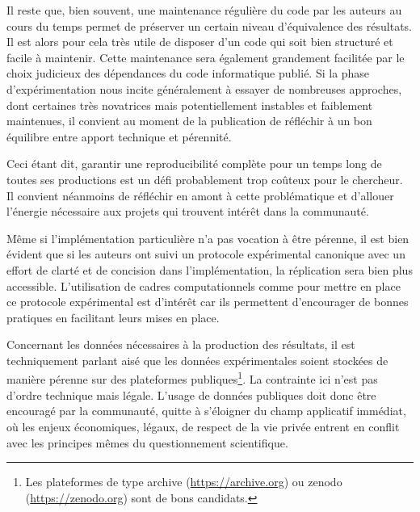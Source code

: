 Il reste que, bien souvent, une maintenance régulière du code par les auteurs au cours du temps permet de préserver un certain niveau d'équivalence des résultats. Il est alors pour cela très utile de disposer d'un code qui soit bien structuré et facile à maintenir. Cette maintenance sera également grandement facilitée par le choix judicieux des dépendances du code informatique publié. Si la phase d'expérimentation nous incite généralement à essayer de nombreuses approches, dont certaines très novatrices mais potentiellement instables et faiblement maintenues, il convient au moment de la publication de réfléchir à un bon équilibre entre apport technique et pérennité.

Ceci étant dit, garantir une reproducibilité complète pour un temps long de toutes ses productions est un défi probablement trop coûteux pour le chercheur. Il convient néanmoins de réfléchir en amont à cette problématique et d'allouer l'énergie nécessaire aux projets qui trouvent intérêt dans la communauté.

Même si l'implémentation particulière n'a pas vocation à être pérenne, il est bien évident que si les auteurs ont suivi un protocole expérimental canonique avec un effort de clarté et de concision dans l'implémentation, la réplication sera bien plus accessible. L'utilisation de cadres computationnels comme \explanes pour mettre en place ce protocole expérimental est d'intérêt car ils permettent d'encourager de bonnes pratiques en facilitant leurs mises en place.

Concernant les données nécessaires à la production des résultats, il est techniquement parlant aisé que les données expérimentales soient stockées de manière pérenne sur des plateformes publiques\footnote{Les plateformes de type \textsf
{archive} (\url{https://archive.org}) ou \textsf
{zenodo} (\url{https://zenodo.org}) sont de bons candidats.}. La contrainte ici n'est pas d'ordre technique mais légale. L'usage de données publiques doit donc être encouragé par la communauté, quitte à s'éloigner du champ applicatif immédiat, où les enjeux économiques, légaux, de respect de la vie privée entrent en conflit avec les principes mêmes du questionnement scientifique.
